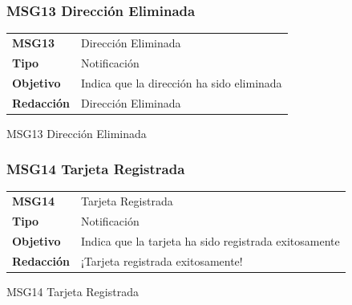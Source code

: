 \documentclass[14pt]{article}
\begin{document}
            \subsubsection{MSG13 Dirección Eliminada}\label{MSG13 Dirección Eliminada}
                \begin{table}[H]
                    \begin{center}
                        \begin{tabular}{| l | l | } \hline
                        \textbf{MSG13} & Dirección Eliminada\\
                        \textbf{Tipo} & Notificación \\
                        \textbf{Objetivo} & Indica que la dirección ha sido eliminada \\
                        \textbf{Redacción} & Dirección Eliminada \\ \hline
                        \end{tabular}
                        
                        \vspace{0.3cm} MSG13 Dirección Eliminada
                    \end{center}
                \end{table}
                
            \subsubsection{MSG14 Tarjeta Registrada}\label{MSG14 Tarjeta Registrada}
                \begin{table}[H]
                    \begin{center}
                        \begin{tabular}{| l | l | } \hline
                        \textbf{MSG14} & Tarjeta Registrada\\
                        \textbf{Tipo} & Notificación \\
                        \textbf{Objetivo} & Indica que la tarjeta ha sido registrada exitosamente \\
                        \textbf{Redacción} & ¡Tarjeta registrada exitosamente! \\ \hline
                        \end{tabular}
                        
                        \vspace{0.3cm} MSG14 Tarjeta Registrada
                    \end{center}
                \end{table}
                
\end{document}
